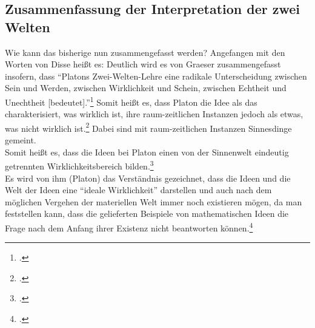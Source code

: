 \subsection{Zusammenfassung der Interpretation der zwei Welten}
Wie kann das bisherige nun zusammengefasst werden? Angefangen mit den Worten von Disse heißt es:
Deutlich wird es von Graeser zusammengefasst insofern, dass \enquote{Platons Zwei-Welten-Lehre eine radikale Unterscheidung zwischen Sein und Werden, zwischen Wirklichkeit und Schein, zwischen Echtheit und Unechtheit [bedeutet].}\footcite[vgl.][S. 134]{GraeserPhiloGeschichte}
Somit heißt es, dass Platon die Idee als das charakterisiert, was wirklich ist, ihre raum-zeitlichen Instanzen jedoch als etwas, was nicht wirklich ist.\footcite[vgl.][S. 139]{GraeserPhiloGeschichte} Dabei sind mit raum-zeitlichen Instanzen Sinnesdinge gemeint.\\
Somit heißt es, dass die Ideen bei Platon einen von der Sinnenwelt eindeutig getrennten Wirklichkeitsbereich bilden.\footcite[][S. 31]{DisseMetaphysik}\\
Es wird von ihm (Platon) das Verständnis gezeichnet, dass die Ideen und die Welt der Ideen eine \enquote{ideale Wirklichkeit} darstellen und auch nach dem möglichen Vergehen der materiellen Welt immer noch existieren mögen, da man feststellen kann, dass die gelieferten Beispiele von mathematischen Ideen die Frage nach dem Anfang ihrer Existenz nicht beantworten können.\footcite[vgl.][S. 99]{Hirschberger} 
